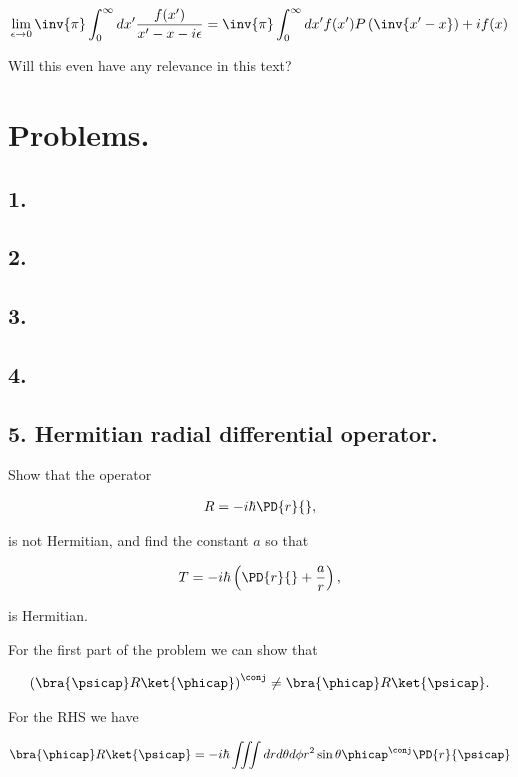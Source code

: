 \begin{align*}
\lim_{\epsilon \rightarrow 0} 
\inv{\pi} \int_0^\infty dx' \frac{f(x')}{x'-x - i \epsilon}
= 
\inv{\pi} \int_0^\infty dx' f(x') P\left( \inv{x' - x} \right) + i f(x)
\end{align*}

Will this even have any relevance in this text?

\section{Problems.}
\subsection{1.}
\subsection{2.}
\subsection{3.}
\subsection{4.}
\subsection{5. Hermitian radial differential operator.}

Show that the operator 

\begin{align*}
R = -i \hbar \PD{r}{},
\end{align*}

is not Hermitian, and find the constant $a$ so that 

\begin{align*}
T = -i \hbar \left( \PD{r}{} + \frac{a}{r} \right),
\end{align*}

is Hermitian.

For the first part of the problem we can show that

\begin{align*}
\left( \bra{\psicap} R \ket{\phicap} \right)^\conj \ne \bra{\phicap} R \ket{\psicap}.
\end{align*}

For the RHS we have

\begin{align*}
\bra{\phicap} R \ket{\psicap} 
= -i \hbar \iiint dr d\theta d\phi r^2 \sin\theta \phicap^\conj \PD{r}{\psicap}
\end{align*}

